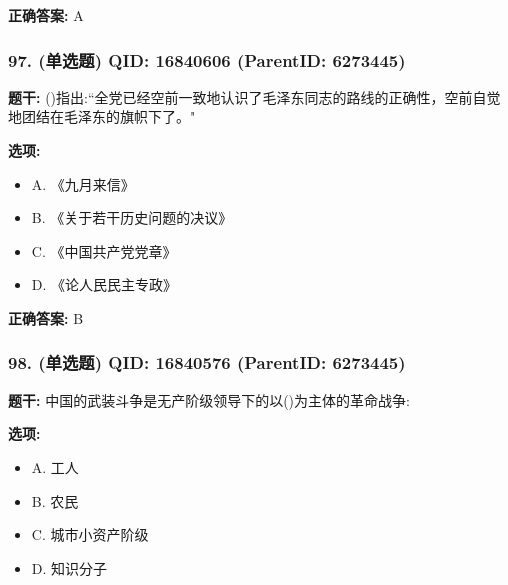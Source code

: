 \documentclass[12pt,UTF8]{ctexart}
\begin{document}
\textbf{正确答案:}
A

\vspace{0.3em}\hrulefill\vspace{0.7em}

\subsubsection*{97. (单选题) \small QID: 16840606 (ParentID: 6273445)}

\textbf{题干:}
()指出:“全党已经空前一致地认识了毛泽东同志的路线的正确性，空前自觉地团结在毛泽东的旗帜下了。"



\textbf{选项:}
\begin{itemize}[leftmargin=*]

  \item A. 《九月来信》

  \item B. 《关于若干历史问题的决议》

  \item C. 《中国共产党党章》

  \item D. 《论人民民主专政》

\end{itemize}

\textbf{正确答案:}
B

\vspace{0.3em}\hrulefill\vspace{0.7em}

\subsubsection*{98. (单选题) \small QID: 16840576 (ParentID: 6273445)}

\textbf{题干:}
中国的武装斗争是无产阶级领导下的以()为主体的革命战争:



\textbf{选项:}
\begin{itemize}[leftmargin=*]

  \item A. 工人

  \item B. 农民

  \item C. 城市小资产阶级

  \item D. 知识分子

\end{itemize}
\end{document}
